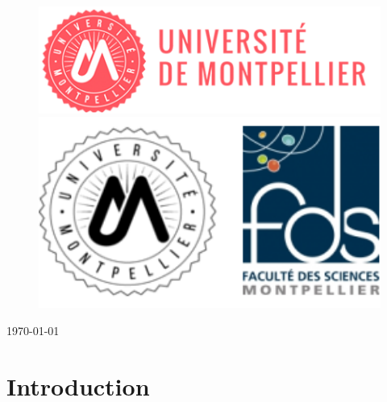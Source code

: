 \documentclass[oneside,13pt,a4paper]{report}
\begin{document}
\begin{titlepage}
        \begin{figure}[h]
            \begin{minipage}[c]{.46\linewidth}
                \centering
                \includegraphics[width=1\textwidth]{img/univ-montpellier.png}
            \end{minipage}
            \hfill%
            \begin{minipage}[c]{.46\linewidth}
                \centering
                \includegraphics[width=1\textwidth]{img/fds.png}
            \end{minipage}
        \end{figure}

        \par\vspace{1cm}

        \vfill

        {\large \today\par}
    \end{titlepage}


    \tableofcontents

\parskip=5pt


    \chapter{Introduction}
\end{document}
